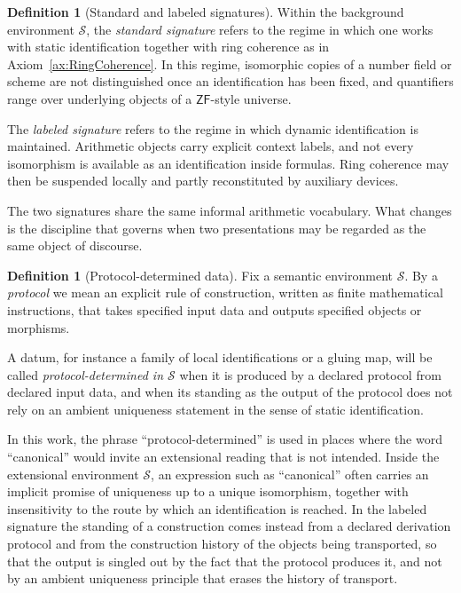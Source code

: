 \documentclass[10pt, reqno]{amsart}
\theoremstyle{plain}
\theoremstyle{definition}
\newtheorem{definition}[theorem]{Definition}
\theoremstyle{plain}
\newcommand{\ZF}{\mathsf{ZF}}
\begin{document}
\begin{definition}[Standard and labeled signatures]\label{def:Signatures}
Within the background environment $\mathcal{S}$, the \emph{standard signature} refers to the regime in which one works with static identification together with ring coherence as in Axiom~\ref{ax:RingCoherence}. In this regime, isomorphic copies of a number field or scheme are not distinguished once an identification has been fixed, and quantifiers range over underlying objects of a $\ZF$-style universe.

The \emph{labeled signature} refers to the regime in which dynamic identification is maintained. Arithmetic objects carry explicit context labels, and not every isomorphism is available as an identification inside formulas. Ring coherence may then be suspended locally and partly reconstituted by auxiliary devices.

The two signatures share the same informal arithmetic vocabulary. What changes is the discipline that governs when two presentations may be regarded as the same object of discourse.
\end{definition}

\begin{definition}[Protocol-determined data]\label{def:ProtocolDetermined}
Fix a semantic environment $\mathcal{S}$. By a \emph{protocol} we mean an explicit rule of construction, written as finite mathematical instructions, that takes specified input data and outputs specified objects or morphisms.

A datum, for instance a family of local identifications or a gluing map, will be called \emph{protocol-determined in $\mathcal{S}$} when it is produced by a declared protocol from declared input data, and when its standing as the output of the protocol does not rely on an ambient uniqueness statement in the sense of static identification.

In this work, the phrase ``protocol-determined'' is used in places where the word ``canonical'' would invite an extensional reading that is not intended. Inside the extensional environment $\mathcal{S}$, an expression such as ``canonical'' often carries an implicit promise of uniqueness up to a unique isomorphism, together with insensitivity to the route by which an identification is reached. In the labeled signature the standing of a construction comes instead from a declared derivation protocol and from the construction history of the objects being transported, so that the output is singled out by the fact that the protocol produces it, and not by an ambient uniqueness principle that erases the history of transport.
\end{definition}
\end{document}
